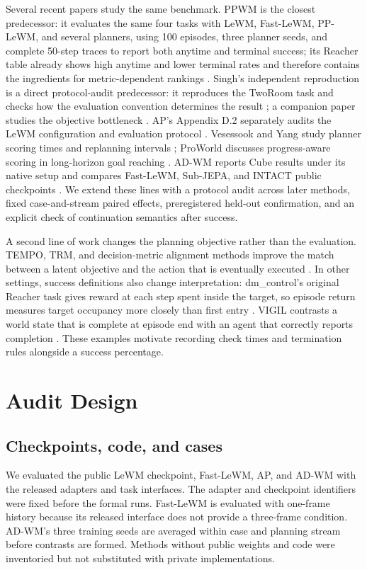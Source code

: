 \documentclass[manuscript,screen,review]{jair}
\begin{document}
Several recent papers study the same benchmark. PPWM is the closest predecessor: it evaluates the same four tasks with LeWM, Fast-LeWM, PP-LeWM, and several planners, using 100 episodes, three planner seeds, and complete 50-step traces to report both anytime and terminal success; its Reacher table already shows high anytime and lower terminal rates and therefore contains the ingredients for metric-dependent rankings \parencite{ppwm2026}. Singh's independent reproduction is a direct protocol-audit predecessor: it reproduces the TwoRoom task and checks how the evaluation convention determines the result \parencite{singh2026}; a companion paper studies the objective bottleneck \parencite{singhobjective2026}. AP's Appendix D.2 separately audits the LeWM configuration and evaluation protocol \parencite{ap2026}. Vesessook and Yang study planner scoring times and replanning intervals \parencite{vesessook2026}; ProWorld discusses progress-aware scoring in long-horizon goal reaching \parencite{proworld2026}. AD-WM reports Cube results under its native setup and compares Fast-LeWM, Sub-JEPA, and INTACT public checkpoints \parencite{adwm2026}. We extend these lines with a protocol audit across later methods, fixed case-and-stream paired effects, preregistered held-out confirmation, and an explicit check of continuation semantics after success.

A second line of work changes the planning objective rather than the evaluation. TEMPO, TRM, and decision-metric alignment methods improve the match between a latent objective and the action that is eventually executed \parencite{tempo2026,trm2026,decisionmetric2026}. In other settings, success definitions also change interpretation: dm\_control's original Reacher task gives reward at each step spent inside the target, so episode return measures target occupancy more closely than first entry \parencite{dmcontrol2018}. VIGIL contrasts a world state that is complete at episode end with an agent that correctly reports completion \parencite{vigil2026}. These examples motivate recording check times and termination rules alongside a success percentage.

\section{Audit Design}
\subsection{Checkpoints, code, and cases}
We evaluated the public LeWM checkpoint, Fast-LeWM, AP, and AD-WM with the released adapters and task interfaces. The adapter and checkpoint identifiers were fixed before the formal runs. Fast-LeWM is evaluated with one-frame history because its released interface does not provide a three-frame condition. AD-WM's three training seeds are averaged within case and planning stream before contrasts are formed. Methods without public weights and code were inventoried but not substituted with private implementations.
\end{document}
